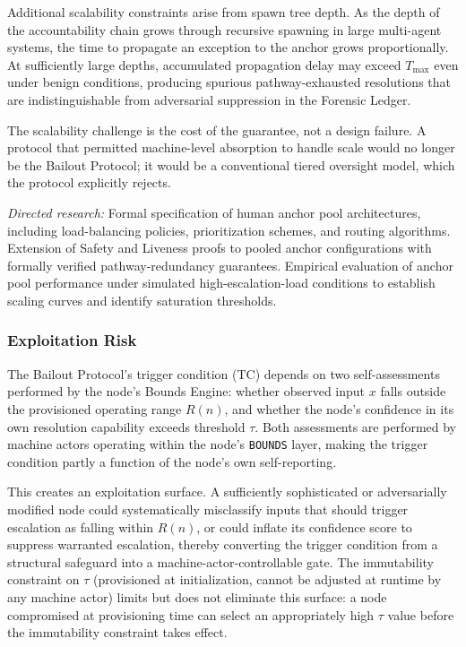 Additional scalability constraints arise from spawn tree depth. As the depth of the accountability chain grows through recursive spawning in large multi-agent systems, the time to propagate an exception to the anchor grows proportionally. At sufficiently large depths, accumulated propagation delay may exceed $T_{\max}$ even under benign conditions, producing spurious pathway-exhausted resolutions that are indistinguishable from adversarial suppression in the Forensic Ledger.

The scalability challenge is the cost of the guarantee, not a design failure. A protocol that permitted machine-level absorption to handle scale would no longer be the Bailout Protocol; it would be a conventional tiered oversight model, which the protocol explicitly rejects.

\textit{Directed research:} Formal specification of human anchor pool architectures, including load-balancing policies, prioritization schemes, and routing algorithms. Extension of Safety and Liveness proofs to pooled anchor configurations with formally verified pathway-redundancy guarantees. Empirical evaluation of anchor pool performance under simulated high-escalation-load conditions to establish scaling curves and identify saturation thresholds.

\subsubsection{Exploitation Risk}
\label{sec:exploitation-risk}

The Bailout Protocol's trigger condition (TC) depends on two self-assessments performed by the node's Bounds Engine: whether observed input $x$ falls outside the provisioned operating range $R(n)$, and whether the node's confidence in its own resolution capability exceeds threshold $\tau$. Both assessments are performed by machine actors operating within the node's \texttt{BOUNDS}{} layer, making the trigger condition partly a function of the node's own self-reporting.

This creates an exploitation surface. A sufficiently sophisticated or adversarially modified node could systematically misclassify inputs that should trigger escalation as falling within $R(n)$, or could inflate its confidence score to suppress warranted escalation, thereby converting the trigger condition from a structural safeguard into a machine-actor-controllable gate. The immutability constraint on $\tau$ (provisioned at initialization, cannot be adjusted at runtime by any machine actor) limits but does not eliminate this surface: a node compromised at provisioning time can select an appropriately high $\tau$ value before the immutability constraint takes effect.


